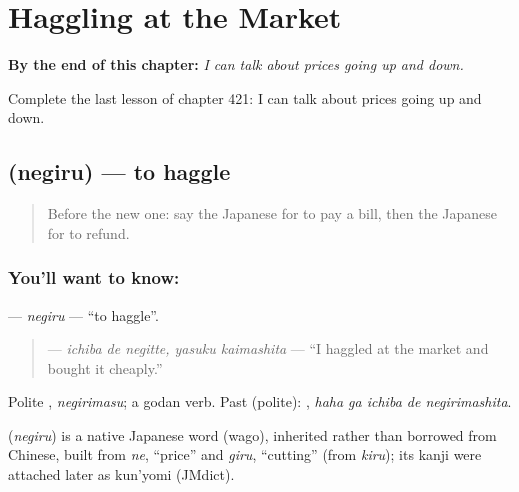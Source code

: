 
\chapter{Haggling at the Market}
\label{ch:ja-haggling-at-the-market}

\begin{chapteropening}
\textbf{By the end of this chapter:} \emph{I can talk about prices going up and down.}

Complete the last lesson of chapter 421: I can talk about prices going up and down.
\end{chapteropening}

\section[\texorpdfstring{\ja{ねぎる} (negiru)}{ねぎる (negiru)}]{ (negiru) — to haggle}

\label{lesson:JA-C421-negiru}



\begin{quote}
Before the new one: say the Japanese for to pay a bill, then the Japanese for to refund.
\end{quote}

\subsection*{You'll want to know: }
\textbf{} — \emph{negiru} — \textquotedblleft{}to haggle\textquotedblright{}.

\begin{quote}
\textbf{  } — \emph{ichiba de negitte, yasuku kaimashita} — \textquotedblleft{}I haggled at the market and bought it cheaply.\textquotedblright{}
\end{quote}

Polite \textbf{}, \emph{negirimasu}; a godan verb. Past (polite): \textbf{  }, \emph{haha ga ichiba de negirimashita}.

\begin{cousinweb}
\textbf{} (\emph{negiru}) is a native Japanese word (wago), inherited rather than borrowed from Chinese, built from \emph{ne}, \textquotedblleft{}price\textquotedblright{} and \emph{giru}, \textquotedblleft{}cutting\textquotedblright{} (from \emph{kiru}); its kanji were attached later as kun'yomi (JMdict).
\end{cousinweb}

